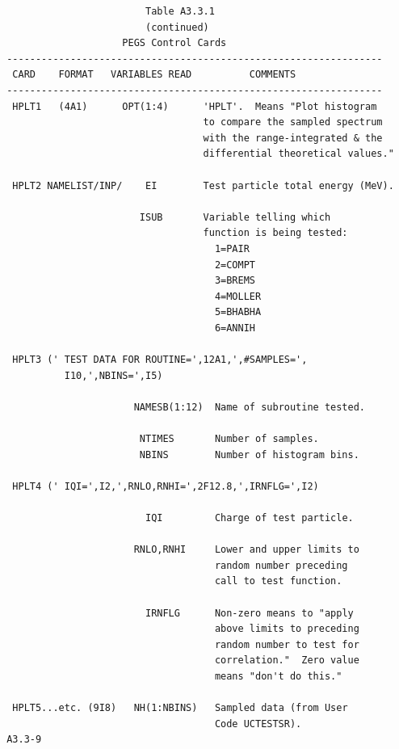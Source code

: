 \newpage {} \begin{verbatim}
                         Table A3.3.1
                         (continued)
                     PEGS Control Cards
 -----------------------------------------------------------------
  CARD    FORMAT   VARIABLES READ          COMMENTS
 -----------------------------------------------------------------
  HPLT1   (4A1)      OPT(1:4)      'HPLT'.  Means "Plot histogram 
                                   to compare the sampled spectrum
                                   with the range-integrated & the 
                                   differential theoretical values."
 
  HPLT2 NAMELIST/INP/    EI        Test particle total energy (MeV).
 
                        ISUB       Variable telling which
                                   function is being tested:
                                     1=PAIR
                                     2=COMPT
                                     3=BREMS
                                     4=MOLLER
                                     5=BHABHA
                                     6=ANNIH
 
  HPLT3 (' TEST DATA FOR ROUTINE=',12A1,',#SAMPLES=',
           I10,',NBINS=',I5)
 
                       NAMESB(1:12)  Name of subroutine tested.
 
                        NTIMES       Number of samples.
                        NBINS        Number of histogram bins.
 
  HPLT4 (' IQI=',I2,',RNLO,RNHI=',2F12.8,',IRNFLG=',I2)
 
                         IQI         Charge of test particle.
 
                       RNLO,RNHI     Lower and upper limits to
                                     random number preceding
                                     call to test function.
 
                         IRNFLG      Non-zero means to "apply
                                     above limits to preceding
                                     random number to test for
                                     correlation."  Zero value
                                     means "don't do this."
 
  HPLT5...etc. (9I8)   NH(1:NBINS)   Sampled data (from User
                                     Code UCTESTSR).
 A3.3-9
\end{verbatim} 

